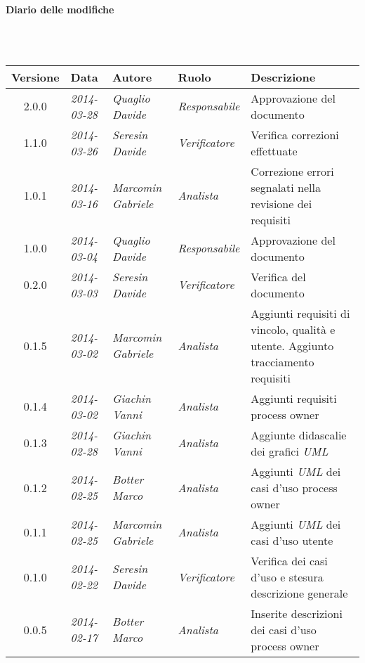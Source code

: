 \noindent\begin{Large}\textbf{Diario delle modifiche}\end{Large}\\
\\
\begin{small}
\begin{tabular}{|c|p{1.8cm}|p{2.8cm}|p{2.8cm}|p{3.5cm}|}
\hline
Versione & Data & Autore & Ruolo & Descrizione \\
\hline
\hline
2.0.0 & \textit{2014-03-28} &
\textit{Quaglio Davide} &
\textit{Responsabile} &  Approvazione del documento\\
\hline
1.1.0 & \textit{2014-03-26} &
\textit{Seresin Davide} &
\textit{Verificatore} &  Verifica correzioni effettuate\\
\hline
1.0.1 & \textit{2014-03-16} &
\textit{Marcomin Gabriele} &
\textit{Analista} &  Correzione errori segnalati nella revisione dei requisiti\\
\hline
1.0.0 & \textit{2014-03-04} &
\textit{Quaglio Davide} &
\textit{Responsabile} &  Approvazione del documento\\
\hline
0.2.0 & \textit{2014-03-03} &
\textit{Seresin Davide} &
\textit{Verificatore} &  Verifica del documento\\
\hline
0.1.5 & \textit{2014-03-02} &
\textit{Marcomin Gabriele} &
\textit{Analista} &  Aggiunti requisiti di vincolo, qualità e utente. Aggiunto tracciamento requisiti\\
\hline
0.1.4 & \textit{2014-03-02} &
\textit{Giachin Vanni} &
\textit{Analista} &  Aggiunti requisiti process owner\\
\hline
0.1.3 & \textit{2014-02-28} &
\textit{Giachin Vanni} &
\textit{Analista} &  Aggiunte didascalie dei grafici \textit{UML}\\
\hline
0.1.2 & \textit{2014-02-25} &
\textit{Botter Marco} &
\textit{Analista} &  Aggiunti \textit{UML} dei casi d'uso process owner\\
\hline
0.1.1 & \textit{2014-02-25} &
\textit{Marcomin Gabriele} &
\textit{Analista} &  Aggiunti \textit{UML} dei casi d'uso utente\\
\hline
0.1.0 & \textit{2014-02-22} &
\textit{Seresin Davide} &
\textit{Verificatore} &  Verifica dei casi d'uso e stesura descrizione generale\\
\hline
0.0.5 & \textit{2014-02-17} &
\textit{Botter Marco} &
\textit{Analista} &  Inserite descrizioni dei casi d'uso process owner\\

\end{tabular}
\end{small}
